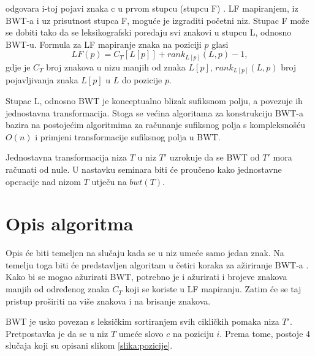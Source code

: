 \documentclass{ferseminar}
\begin{document}
odgovara i-toj pojavi znaka c u prvom stupcu (stupcu F) \cite{skripta}. LF mapiranjem, iz BWT-a i uz prisutnost stupca F, moguće je izgraditi početni niz. Stupac F može se dobiti tako da se leksikografski poredaju svi znakovi u stupcu L, odnosno BWT-u.
Formula za LF mapiranje znaka na poziciji $p$ glasi 
\begin{equation}
	LF(p)=C_T[L[p]]+rank_{L[p]}(L,p)-1 ,
\end{equation}
gdje je $C_T$ broj znakova u nizu manjih od znaka $L[p]$, $rank_{L[p]}(L,p)$ broj pojavljivanja znaka $L[p]$ u $L$ do pozicije $p$.

Stupac L, odnosno BWT je konceptualno blizak sufiksnom polju, a povezuje ih jednostavna transformacija. Stoga se većina algoritama za konstrukciju BWT-a bazira na postojećim algoritmima za računanje sufiksnog polja s kompleksnošću $O(n)$ i primjeni transformacije sufiksnog polja u BWT.

Jednostavna transformacija niza $T$ u niz $T'$ uzrokuje da se BWT od $T'$ mora računati od nule. U nastavku seminara biti će proučeno kako jednostavne operacije nad nizom $T$ utječu na $bwt(T)$. 
\section{Opis algoritma}
Opis će biti temeljen na slučaju kada se u niz umeće samo jedan znak. Na temelju toga biti će predstavljen algoritam u četiri koraka za ažiriranje BWT-a \cite{salson}. Kako bi se mogao ažurirati BWT, potrebno je i ažurirati i brojeve znakova manjih od određenog znaka $C_T$ koji se koriste u LF mapiranju. Zatim će se taj pristup proširiti na više znakova i na brisanje znakova.

BWT je usko povezan s leksičkim sortiranjem svih cikličkih pomaka niza $T'$. Pretpostavka je da se u niz $T$ umeće slovo $c$ na poziciju $i$. Prema tome, postoje 4 slučaja koji su opisani slikom \ref{slika:pozicije}. 
\end{document}
